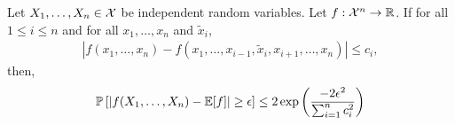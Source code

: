 \documentclass[10pt]{article}
\begin{document}
\begin{problem}[Problem 2]
\begin{enumerate}[nolistsep,label=(\alph*)]
\begin{theorem}
    Let \( X_1,\ldots, X_n\in\mathcal{X} \) be independent random variables. Let \( f:\mathcal{X}^n \to \mathbb{R} \). If for all \( 1\leq i\leq n \) and for all \( x_1,\ldots,x_n \) and \( \tilde{x}_i \),
    \begin{align*}
        |f(x_1,\ldots,x_n) - f(x_1,\ldots,x_{i-1},\tilde{x}_i,x_{i+1},\ldots,x_n)| \leq c_i,
    \end{align*}
    then,
    \begin{align*}
        \mathbb{P} \left[ |f(X_1,\ldots, X_n) - \mathbb{E}[f] | \geq \epsilon \right] \leq 2\exp \left( \frac{-2\epsilon^2}{\sum_{i=1}^{n} c_i^2} \right)
    \end{align*}
\end{theorem}
\end{enumerate}
\end{problem}
\end{document}
